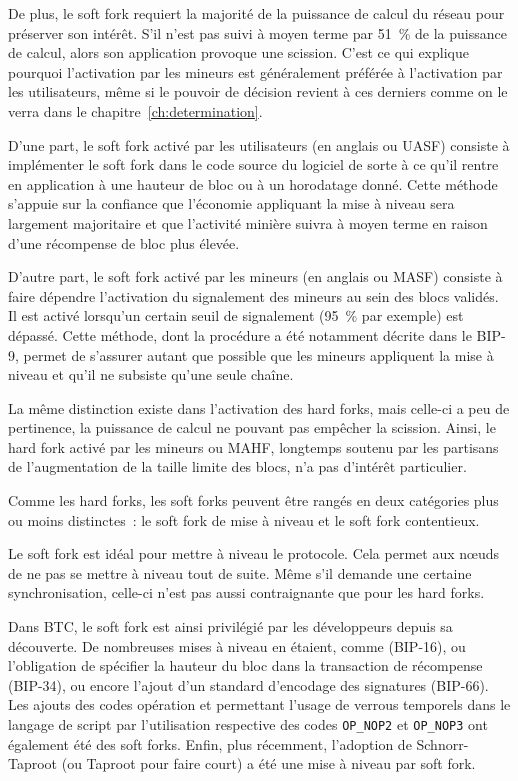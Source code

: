 De plus, le soft fork requiert la majorité de la puissance de calcul du réseau pour préserver son intérêt. S'il n'est pas suivi à moyen terme par 51~\% de la puissance de calcul, alors son application provoque une scission. C'est ce qui explique pourquoi l'activation par les mineurs est généralement préférée à l'activation par les utilisateurs, même si le pouvoir de décision revient à ces derniers comme on le verra dans le chapitre~\ref{ch:determination}.

D'une part, le soft fork activé par les utilisateurs (en anglais  ou UASF) consiste à implémenter le soft fork dans le code source du logiciel de sorte à ce qu'il rentre en application à une hauteur de bloc ou à un horodatage donné. Cette méthode s'appuie sur la confiance que l'économie appliquant la mise à niveau sera largement majoritaire et que l'activité minière suivra à moyen terme en raison d'une récompense de bloc plus élevée.

D'autre part, le soft fork activé par les mineurs (en anglais  ou MASF) consiste à faire dépendre l'activation du signalement des mineurs au sein des blocs validés. Il est activé lorsqu'un certain seuil de signalement (95~\% par exemple) est dépassé. Cette méthode, dont la procédure a été notamment décrite dans le BIP-9, permet de s'assurer autant que possible que les mineurs appliquent la mise à niveau et qu'il ne subsiste qu'une seule chaîne.

La même distinction existe dans l'activation des hard forks, mais celle-ci a peu de pertinence, la puissance de calcul ne pouvant pas empêcher la scission. Ainsi, le hard fork activé par les mineurs ou MAHF, longtemps soutenu par les partisans de l'augmentation de la taille limite des blocs, n'a pas d'intérêt particulier.

Comme les hard forks, les soft forks peuvent être rangés en deux catégories plus ou moins distinctes~: le soft fork de mise à niveau et le soft fork contentieux.

Le soft fork est idéal pour mettre à niveau le protocole. Cela permet aux nœuds de ne pas se mettre à niveau tout de suite. Même s'il demande une certaine synchronisation, celle-ci n'est pas aussi contraignante que pour les hard forks.

Dans BTC, le soft fork est ainsi privilégié par les développeurs depuis sa découverte. De nombreuses mises à niveau en étaient, comme  (BIP-16), ou l'obligation de spécifier la hauteur du bloc dans la transaction de récompense (BIP-34), ou encore l'ajout d'un standard d'encodage des signatures (BIP-66). Les ajouts des codes opération  et  permettant l'usage de verrous temporels dans le langage de script par l'utilisation respective des codes \texttt{OP\_NOP2} et \texttt{OP\_NOP3} ont également été des soft forks. Enfin, plus récemment, l'adoption de Schnorr-Taproot (ou Taproot pour faire court) a été une mise à niveau par soft fork.

